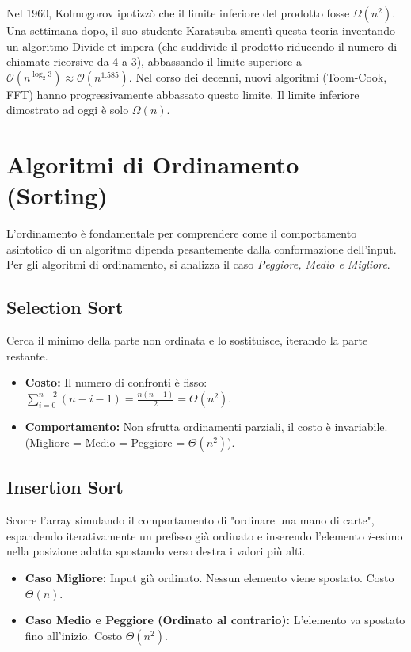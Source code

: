 \documentclass[12pt, a4paper]{article}
\begin{document}
Nel 1960, Kolmogorov ipotizzò che il limite inferiore del prodotto fosse $\Omega(n^2)$. Una settimana dopo, il suo studente Karatsuba smentì questa teoria inventando un algoritmo Divide-et-impera (che suddivide il prodotto riducendo il numero di chiamate ricorsive da 4 a 3), abbassando il limite superiore a $\mathcal{O}(n^{\log_2 3}) \approx \mathcal{O}(n^{1.585})$. Nel corso dei decenni, nuovi algoritmi (Toom-Cook, FFT) hanno progressivamente abbassato questo limite. Il limite inferiore dimostrato ad oggi è solo $\Omega(n)$.

\newpage

\section{Algoritmi di Ordinamento (Sorting)}

L'ordinamento è fondamentale per comprendere come il comportamento asintotico di un algoritmo dipenda pesantemente dalla conformazione dell'input.
Per gli algoritmi di ordinamento, si analizza il caso \textit{Peggiore, Medio e Migliore}.

\subsection{Selection Sort}
Cerca il minimo della parte non ordinata e lo sostituisce, iterando la parte restante.
\begin{itemize}
\item \textbf{Costo:} Il numero di confronti è fisso: $\sum_{i=0}^{n-2}(n-i-1) = \frac{n(n-1)}{2} = \Theta(n^2)$.
\item \textbf{Comportamento:} Non sfrutta ordinamenti parziali, il costo è invariabile. (Migliore = Medio = Peggiore = $\Theta(n^2)$).
\end{itemize}

\subsection{Insertion Sort}
Scorre l'array simulando il comportamento di "ordinare una mano di carte", espandendo iterativamente un prefisso già ordinato e inserendo l'elemento $i$-esimo nella posizione adatta spostando verso destra i valori più alti.
\begin{itemize}
\item \textbf{Caso Migliore:} Input già ordinato. Nessun elemento viene spostato. Costo $\Theta(n)$.
\item \textbf{Caso Medio e Peggiore (Ordinato al contrario):} L'elemento va spostato fino all'inizio. Costo $\Theta(n^2)$.
\end{itemize}
\end{document}
